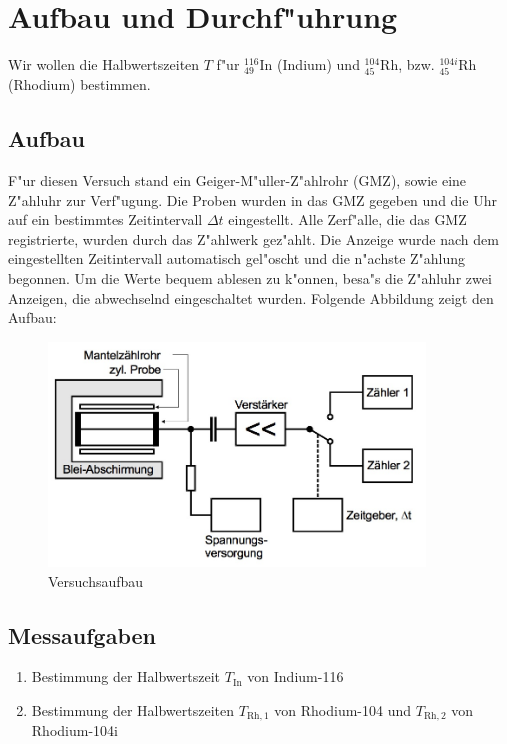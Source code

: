 \section{Aufbau und Durchf"uhrung}
	\label{sec:durchfuehrung}

	Wir wollen die Halbwertszeiten $T$ f"ur ${}_{49}^{116}\mathrm{In}$ (Indium) und ${}_{45}^{104}\mathrm{Rh}$, bzw. ${}_{45}^{104i}\mathrm{Rh}$ (Rhodium) bestimmen.

	\subsection{Aufbau}
		\label{subsec:aufbau}
		F"ur diesen Versuch stand ein Geiger-M"uller-Z"ahlrohr (GMZ), sowie eine Z"ahluhr zur Verf"ugung.
		Die Proben wurden in das GMZ gegeben und die Uhr auf ein bestimmtes Zeitintervall $\Delta t$ eingestellt.
		Alle Zerf"alle, die das GMZ registrierte, wurden durch das Z"ahlwerk gez"ahlt.
		Die Anzeige wurde nach dem eingestellten Zeitintervall automatisch gel"oscht und die n"achste Z"ahlung begonnen.
		Um die Werte bequem ablesen zu k"onnen, besa"s die Z"ahluhr zwei Anzeigen, die abwechselnd eingeschaltet wurden.
		Folgende Ab\-bil\-dung zeigt den Aufbau:

		\begin{figure}[!h]
			\centering
			\includegraphics[width = 10cm]{img/aufbau.jpg}
			\caption{Versuchsaufbau \cite{anleitung}}
			\label{fig:aufbau}
		\end{figure}

	\subsection{Messaufgaben}
		\label{subsec:aufgaben}
		\begin{enumerate}
			\item{Bestimmung der Halbwertszeit $T_\mathrm{In}$ von Indium-116}
			\item{Bestimmung der Halbwertszeiten $T_{\mathrm{Rh}, 1}$ von Rhodium-104 und $T_{\mathrm{Rh}, 2}$ von Rhodium-104i}
		\end{enumerate}